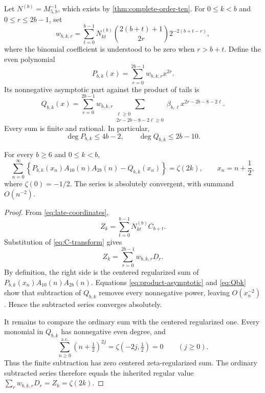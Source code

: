 Let $N^{(b)}=M_{5,b}^{-1}$, which exists by
\cref{thm:complete-order-ten}.  For $0\le k<b$ and
$0\le r\le2b-1$, set
\begin{equation}
 w_{b,k,r}=\sum_{t=0}^{b-1}N^{(b)}_{kt}
      \binom{2(b+t)+1}{2r}
      2^{-2(b+t-r)},
 \label{eq:reconstruction-weight}
\end{equation}
where the binomial coefficient is understood to be zero when
$r>b+t$.  Define the even polynomial
\begin{equation}
 P_{b,k}(x)=\sum_{r=0}^{2b-1}w_{b,k,r}x^{2r}.
 \label{eq:Pbk}
\end{equation}
Its nonnegative asymptotic part against the product of tails is
\begin{equation}
 Q_{b,k}(x)=
 \sum_{r=0}^{2b-1}w_{b,k,r}
 \sum_{\substack{\ell\ge0\\2r-2b-8-2\ell\ge0}}
     \beta_{b,\ell}x^{2r-2b-8-2\ell}.
 \label{eq:Qbk}
\end{equation}
Every sum is finite and rational.  In particular,
\begin{equation}
 \deg P_{b,k}\le4b-2,
 \qquad
 \deg Q_{b,k}\le2b-10.
 \label{eq:PQ-degrees}
\end{equation}

\begin{theorem}
\label{thm:ordinary-reconstruction}
For every $b\ge6$ and $0\le k<b$,
\begin{equation}
 \boxed{\displaystyle
 \sum_{n=0}^{\infty}
 \left\{
 P_{b,k}(x_n)A_{10}(n)A_{2b}(n)-Q_{b,k}(x_n)
 \right\}=\zeta(2k),}
 \qquad x_n=n+\frac12,
 \label{eq:ordinary-reconstruction}
\end{equation}
where $\zeta(0)=-1/2$.  The series is absolutely convergent, with
summand $O(n^{-2})$.
\end{theorem}

\begin{proof}
From \eqref{eq:late-coordinates},
\[
 Z_k=\sum_{t=0}^{b-1}N^{(b)}_{kt}C_{b+t}.
\]
Substitution of \eqref{eq:C-transform} gives
\[
 Z_k=\sum_{r=0}^{2b-1}w_{b,k,r}D_r.
\]
By definition, the right side is the centered regularized sum of
$P_{b,k}(x_n)A_{10}(n)A_{2b}(n)$.  Equations
\eqref{eq:product-asymptotic} and \eqref{eq:Qbk} show that subtraction
of $Q_{b,k}$ removes every nonnegative power, leaving $O(x_n^{-2})$.
Hence the subtracted series converges absolutely.

It remains to compare the ordinary sum with the centered regularized
one.  Every monomial in $Q_{b,k}$ has nonnegative even degree, and
\[
 \sum_{n\ge0}^{\mathrm{a.c.}}(n+\tfrac12)^{2j}
   =\zeta(-2j,\tfrac12)=0\qquad(j\ge0).
\]
Thus the finite subtraction has zero centered zeta-regularized sum.
The ordinary subtracted series therefore equals the inherited regular
value $\sum_rw_{b,k,r}D_r=Z_k=\zeta(2k)$.
\end{proof}

